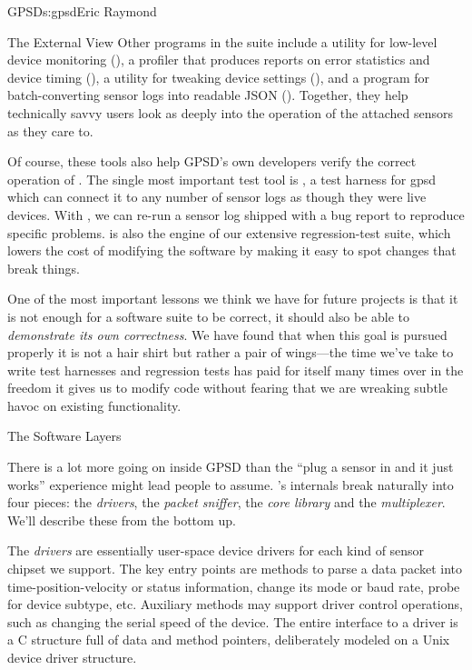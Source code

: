 \begin{aosachapter}{GPSD}{s:gpsd}{Eric Raymond}
\begin{aosasect1}{The External View}
Other programs in the suite include a utility for low-level device
monitoring (), a profiler that produces reports on error
statistics and device timing (), a utility for tweaking
device settings (), and a program for batch-converting
sensor logs into readable JSON (). Together, they help
technically savvy users look as deeply into the operation of the
attached sensors as they care to.

Of course, these tools also help GPSD's own developers verify the
correct operation of . The single most important test tool
is , a test harness for gpsd which can connect it to any
number of sensor logs as though they were live devices.  With
, we can re-run a sensor log shipped with a bug report
to reproduce specific problems.   is also the engine of
our extensive regression-test suite, which lowers the cost of
modifying the software by making it easy to spot changes that break
things.

One of the most important lessons we think we have for future projects
is that it is not enough for a software suite to be correct, it should
also be able to \emph{demonstrate its own correctness}.  We have found that
when this goal is pursued properly it is not a hair shirt but rather a
pair of wings---the time we've take to write test harnesses and
regression tests has paid for itself many times over in the freedom
it gives us to modify code without fearing that we are wreaking
subtle havoc on existing functionality.

\end{aosasect1}

\begin{aosasect1}{The Software Layers}

There is a lot more going on inside GPSD than the ``plug a sensor in
and it just works'' experience might lead people to assume.
's internals break naturally into four pieces: the
\emph{drivers}, the \emph{packet sniffer}, the \emph{core library} and
the \emph{multiplexer}. We'll describe these from the bottom up.


The \emph{drivers} are essentially user-space device drivers for each
kind of sensor chipset we support.  The key entry points are methods
to parse a data packet into time-position-velocity or status
information, change its mode or baud rate, probe for device subtype,
etc.  Auxiliary methods may support driver control operations, such as
changing the serial speed of the device. The entire interface to a
driver is a C structure full of data and method pointers, deliberately
modeled on a Unix device driver structure.


\end{aosasect1}
\end{aosachapter}
